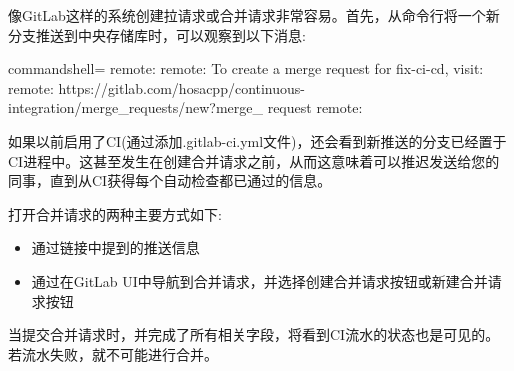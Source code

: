 像GitLab这样的系统创建拉请求或合并请求非常容易。首先，从命令行将一个新分支推送到中央存储库时，可以观察到以下消息:

\begin{tcblisting}{commandshell={}}
remote:
remote: To create a merge request for fix-ci-cd, visit:
remote:
https://gitlab.com/hosacpp/continuous-integration/merge_requests/new?merge_
request%
remote:
\end{tcblisting}

如果以前启用了CI(通过添加.gitlab-ci.yml文件)，还会看到新推送的分支已经置于CI进程中。这甚至发生在创建合并请求之前，从而这意味着可以推迟发送给您的同事，直到从CI获得每个自动检查都已通过的信息。

打开合并请求的两种主要方式如下:

\begin{itemize}
\item 
通过链接中提到的推送信息

\item 
通过在GitLab UI中导航到合并请求，并选择创建合并请求按钮或新建合并请求按钮
\end{itemize}

当提交合并请求时，并完成了所有相关字段，将看到CI流水的状态也是可见的。若流水失败，就不可能进行合并。

























